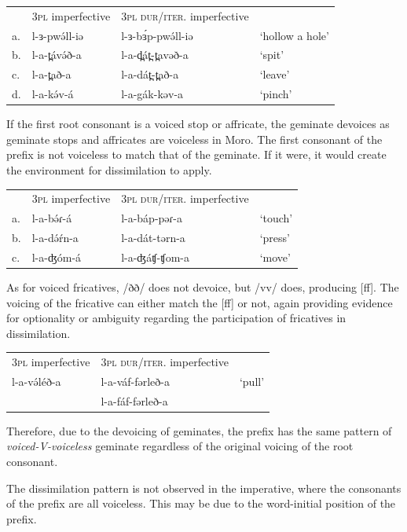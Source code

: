 \ea
\begin{tabular}[t]{llll}
&	 	3\textsc{pl} imperfective		&	3\textsc{pl} \textsc{dur}/\textsc{iter}. imperfective\\
a.&	l-ɜ-pwə́ll-iə	&	l-ɜ-bɜ́p-pwə́ll-iə	&	‘hollow a hole’\\
b.&	l-a-t̪ávə́ð-a	&	l-a-d̪át̪-t̪avəð-a	&	‘spit’\\
c.&	l-a-t̪að-a	&	l-a-dát̪-t̪að-a	&	‘leave’\\
d.&	l-a-kə́v-á	&	l-a-gák-kəv-a	&	‘pinch’\\
\end{tabular}
\z

If the first root consonant is a voiced stop or affricate, the geminate devoices as geminate stops and affricates are voiceless in Moro. The first consonant of the prefix is not voiceless to match that of the geminate. If it were, it would create the environment for dissimilation to apply. 

\ea
\begin{tabular}[t]{llll}
&	 3\textsc{pl} imperfective	&	3\textsc{pl} \textsc{dur}/\textsc{iter}. imperfective\\
a.&	l-a-bə́ɾ-á	&	l-a-báp-pəɾ-a	&	‘touch’\\
b.&	l-a-də́ŕn-a	&	l-a-dát-tərn-a	&	‘press’\\
c.&	l-a-ʤóm-á	&	l-a-ʤáʧ-ʧom-a	&	‘move’\\
\end{tabular}
\z

As for voiced fricatives, /ðð/ does not devoice, but /vv/ does, producing [ff]. The voicing of the fricative can either match the [ff] or not, again providing evidence for optionality or ambiguity regarding the participation of fricatives in dissimilation. 

\ea
\begin{tabular}[t]{lll}
3\textsc{pl} imperfective	&	3\textsc{pl} \textsc{dur}/\textsc{iter}. imperfective\\
l-a-və́léð-a	&	l-a-váf-fərleð-a		&	‘pull’\\
			&	l-a-fáf-fərleð-a\\
\end{tabular}
\z

Therefore, due to the devoicing of geminates, the prefix has the same pattern of \textit{voiced-V-voiceless} geminate regardless of the original voicing of the root consonant.

The dissimilation pattern is not observed in the imperative, where the consonants of the prefix are all voiceless. This may be due to the word-initial position of the prefix. 

